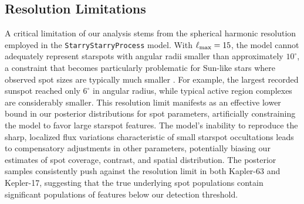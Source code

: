 \documentclass[twocolumn]{aastex631}
\begin{document}
\subsection{Resolution Limitations}

A critical limitation of our analysis stems from the spherical harmonic resolution employed in the \texttt{StarryStarryProcess} 
model. With $\ell_{\rm max} = 15$, the model cannot adequately represent starspots with angular radii smaller than approximately 
$10^\circ$, a constraint that becomes particularly problematic for Sun-like stars where observed spot sizes are 
typically much smaller \citep{Baumann2005}. For example, the largest recorded sunspot reached only $6^\circ$ in angular radius, 
while typical active region complexes are considerably smaller. This resolution limit manifests as an 
effective lower bound in our posterior distributions for spot parameters, artificially constraining the model to 
favor large starspot features. The model's inability to reproduce the sharp, 
localized flux variations characteristic of small starspot occultations leads to compensatory adjustments in other parameters, 
potentially biasing our estimates of spot coverage, contrast, and spatial distribution. The posterior samples consistently 
push against the resolution limit in both Kapler-63 and Kepler-17, suggesting that the true underlying spot populations contain 
significant populations of features below our detection threshold.
\end{document}
